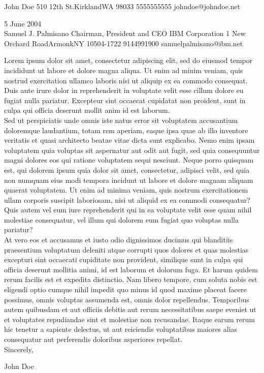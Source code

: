 \documentclass[10pt,letterpaper]{article}
\begin{document}
\begin{center}
  {\huge{John Doe}\vspace{4pt}}
  {510 12th St.}{Kirkland}{WA 98033}
  {5555555555}
  {johndoe@johndoe.net}
\end{center}

5 June 2004 \\
  
\coverletterref
  {Samuel J. Palmisano}
  {Chairman, President and CEO}
  {IBM Corporation}
  {1 New Orchard Road}{Armonk}{NY 10504-1722}
  {9144991900}
  {samuelpalmisano@ibm.net}

  Lorem ipsum dolor sit amet, consectetur adipiscing elit, sed do eiusmod tempor incididunt ut labore et dolore magna aliqua. Ut enim ad minim veniam, quis nostrud exercitation ullamco laboris nisi ut aliquip ex ea commodo consequat. Duis aute irure dolor in reprehenderit in voluptate velit esse cillum dolore eu fugiat nulla pariatur. Excepteur sint occaecat cupidatat non proident, sunt in culpa qui officia deserunt mollit anim id est laborum. \\

  Sed ut perspiciatis unde omnis iste natus error sit voluptatem accusantium doloremque laudantium, totam rem aperiam, eaque ipsa quae ab illo inventore veritatis et quasi architecto beatae vitae dicta sunt explicabo. Nemo enim ipsam voluptatem quia voluptas sit aspernatur aut odit aut fugit, sed quia consequuntur magni dolores eos qui ratione voluptatem sequi nesciunt. Neque porro quisquam est, qui dolorem ipsum quia dolor sit amet, consectetur, adipisci velit, sed quia non numquam eius modi tempora incidunt ut labore et dolore magnam aliquam quaerat voluptatem. Ut enim ad minima veniam, quis nostrum exercitationem ullam corporis suscipit laboriosam, nisi ut aliquid ex ea commodi consequatur? Quis autem vel eum iure reprehenderit qui in ea voluptate velit esse quam nihil molestiae consequatur, vel illum qui dolorem eum fugiat quo voluptas nulla pariatur? \\

  At vero eos et accusamus et iusto odio dignissimos ducimus qui blanditiis praesentium voluptatum deleniti atque corrupti quos dolores et quas molestias excepturi sint occaecati cupiditate non provident, similique sunt in culpa qui officia deserunt mollitia animi, id est laborum et dolorum fuga. Et harum quidem rerum facilis est et expedita distinctio. Nam libero tempore, cum soluta nobis est eligendi optio cumque nihil impedit quo minus id quod maxime placeat facere possimus, omnis voluptas assumenda est, omnis dolor repellendus. Temporibus autem quibusdam et aut officiis debitis aut rerum necessitatibus saepe eveniet ut et voluptates repudiandae sint et molestiae non recusandae. Itaque earum rerum hic tenetur a sapiente delectus, ut aut reiciendis voluptatibus maiores alias consequatur aut perferendis doloribus asperiores repellat. \\
  
  Sincerely,

  \vspace{40pt}

  John Doe
\end{document}
